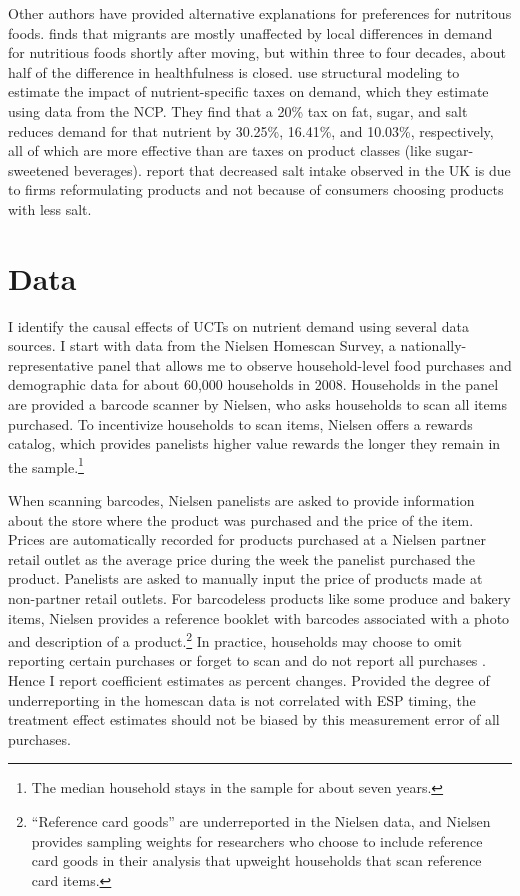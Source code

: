 \documentclass[12pt]{article}
\begin{document}
Other authors have provided alternative explanations for preferences for nutritous foods. \textcite{hut2020determinants} finds that migrants are mostly unaffected by local differences in demand for nutritious foods shortly after moving, but within three to four decades, about half of the difference in healthfulness is closed. \textcite{harding2017effect} use structural modeling to estimate the impact of nutrient-specific taxes on demand, which they estimate using data from the NCP. They find that a 20\% tax on fat, sugar, and salt reduces demand for that nutrient by 30.25\%, 16.41\%, and 10.03\%, respectively, all of which are more effective than are taxes on product classes (like sugar-sweetened beverages). \textcite{griffith2017importance} report that decreased salt intake observed in the UK is due to firms reformulating products and not because of consumers choosing products with less salt.

\section{Data} \label{data}

I identify the causal effects of UCTs on nutrient demand using several data sources. I start with data from the Nielsen Homescan Survey, a nationally-representative panel that allows me to observe household-level food purchases and demographic data for about 60,000 households in 2008. Households in the panel are provided a barcode scanner by Nielsen, who asks households to scan all items purchased. To incentivize households to scan items, Nielsen offers a rewards catalog, which provides panelists higher value rewards the longer they remain in the sample.\footnote{The median household stays in the sample for about seven years.}

When scanning barcodes, Nielsen panelists are asked to provide information about the store where the product was purchased and the price of the item. Prices are automatically recorded for products purchased at a Nielsen partner retail outlet as the average price during the week the panelist purchased the product. Panelists are asked to manually input the price of products made at non-partner retail outlets. For barcodeless products like some produce and bakery items, Nielsen provides a reference booklet with barcodes associated with a photo and description of a product.\footnote{``Reference card goods'' are underreported in the Nielsen data, and Nielsen provides sampling weights for researchers who choose to include reference card goods in their analysis that upweight households that scan reference card items.} In practice, households may choose to omit reporting certain purchases or forget to scan and do not report all purchases \parencite{einav2010recording}. Hence I report coefficient estimates as percent changes. Provided the degree of underreporting in the homescan data is not correlated with ESP timing, the treatment effect estimates should not be biased by this measurement error of all purchases.
\end{document}
